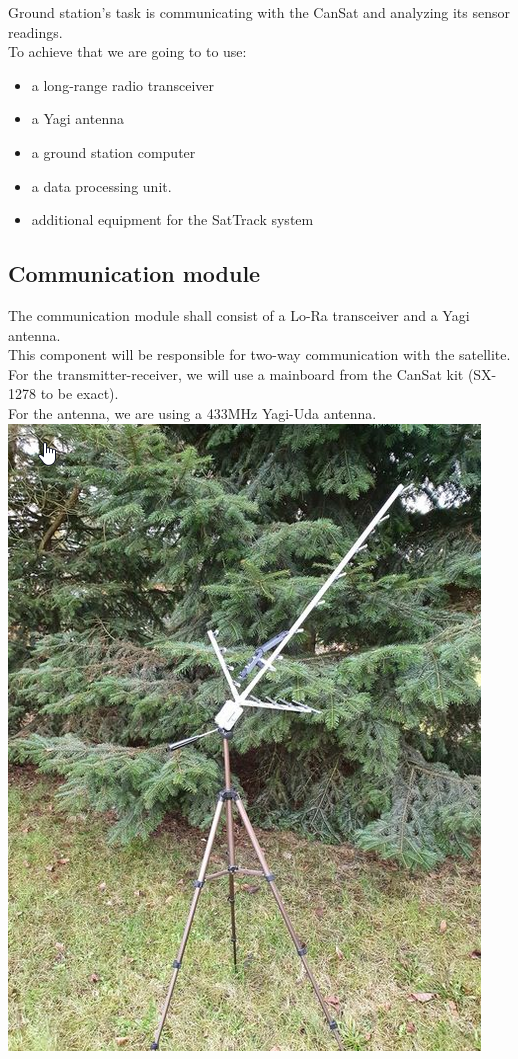 \documentclass[class=report, crop=false]{standalone}
\begin{document}
Ground station's task is communicating with the CanSat and analyzing its sensor readings. \\
To achieve that we are going to to use:
\begin{itemize}
\item a long-range radio transceiver 
\item a Yagi antenna 
\item a ground station computer
\item a data processing unit.
\item additional equipment for the SatTrack system 
\end{itemize}
\subsection*{Communication module}
The communication module shall consist of a Lo-Ra transceiver and a Yagi antenna. \\
This component will be responsible for two-way communication with the satellite. \\
For the transmitter-receiver, we will use a mainboard from the CanSat kit (SX-1278 to be exact). \\
For the antenna, we are using a 433MHz Yagi-Uda antenna. \\
\includegraphics[width=\columnwidth]{ext/radio.png}
\newpage
\end{document}
